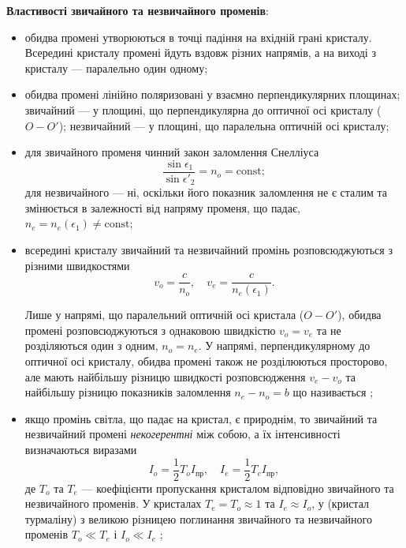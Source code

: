 \bigskip

\textbf{Властивості звичайного та незвичайного променів}:

\medskip

\begin{itemize}
\item обидва промені утворюються в точці падіння на вхідній грані
кристалу. Всередині кристалу промені йдуть вздовж різних напрямів,
а на виході з кристалу --- паралельно один одному;
\item обидва промені лінійно поляризовані у взаємно перпендикулярних
площинах; звичайний --- у площині, що перпендикулярна до оптичної
осі кристалу ($ O-O' $); незвичайний --- у площині, що паралельна
оптичній осі кристалу;
\item для звичайного променя чинний закон заломлення Снелліуса
\begin{equation*}
    \frac{\sin\epsilon_1}{\sin\epsilon'_2} = n_o = \mathrm{const};
\end{equation*} для незвичайного --- ні, оскільки його
показник заломлення не є сталим та змінюється в залежності від
напряму променя, що падає, $n_e = n_e (\epsilon_1) \neq \mathrm{const}$;
\item всередині кристалу звичайний та незвичайний промінь
розповсюджуються з різними швидкостями
\begin{equation*}
 v_o = \frac{c}{n_o}, \quad v_e = \frac{c}{n_e(\epsilon_1)}.
\end{equation*}

Лише у напрямі, що паралельний оптичній осі
кристала ($O-O'$), обидва промені розповсюджуються з однаковою
швидкістю $v_o = v_e$ та не розділяються один з одним, $n_o = n_e$. У
напрямі, перпендикулярному до оптичної осі кристалу, обидва
промені також не розділюються просторово, але мають найбільшу
різницю швидкості розповсюдження $v_e - v_o$ та найбільшу різницю
показників заломлення $n_e - n_o = b$ що називається ;

\item якщо промінь світла, що падає на кристал, є природнім, то звичайний
та незвичайний промені \emph{некогерентні} між собою, а їх інтенсивності
визначаються виразами
\begin{equation*}
    I_o = \frac12 T_o I_\text{пр}, \quad I_e = \frac12 T_e I_\text{пр},
\end{equation*}
де $ T_o $ та $ T_e $ --- коефіцієнти пропускання кристалом відповідно звичайного та незвичайного променів. У  кристалах $T_e = T_o \approx 1$ та $ I_e \approx I_o $, у  (кристал
турмаліну) з великою різницею поглинання звичайного та незвичайного
променів $ T_o \ll T_e $ і  $ I_o \ll I_e $ ;


\end{itemize}
